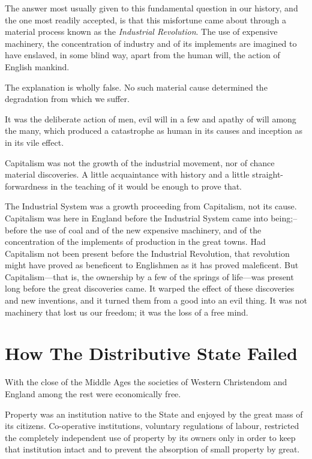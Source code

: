 \documentclass{book}
\begin{document}
The answer most usually given to this fundamental question in our history, and the one most readily accepted, is that this misfortune came about through a material process known as the \emph{Industrial Revolution}. The use of expensive machinery, the concentration of industry and of its implements are imagined to have enslaved, in some blind way, apart from the human will, the action of English mankind.

The explanation is wholly false. No such material cause determined the degradation from which we suffer.

It was the deliberate action of men, evil will in a few and apathy of will among the many, which produced a catastrophe as human in its causes and inception as in its vile effect.

Capitalism was not the growth of the industrial movement, nor of chance material discoveries. A little acquaintance with history and a little straight-forwardness in the teaching of it would be enough to prove that.

The Industrial System was a growth proceeding from Capitalism, not its cause. Capitalism was here in England before the Industrial System came into being;–before the use of coal and of the new expensive machinery, and of the concentration of the implements of production in the great towns. Had Capitalism not been present before the Industrial Revolution, that revolution might have proved as beneficent to Englishmen as it has proved maleficent. But Capitalism—that is, the ownership by a few of the springs of life—was present long before the great discoveries came. It warped the effect of these discoveries and new inventions, and it turned them from a good into an evil thing. It was not machinery that lost us our freedom; it was the loss of a free mind.

\chapter{How The Distributive State Failed}
\label{chapter-4}
With the close of the Middle Ages the societies of Western Christendom and England among the rest were economically free.

Property was an institution native to the State and enjoyed by the great mass of its citizens. Co-operative institutions, voluntary regulations of labour, restricted the completely independent use of property by its owners only in order to keep that institution intact and to prevent the absorption of small property by great.
\end{document}

